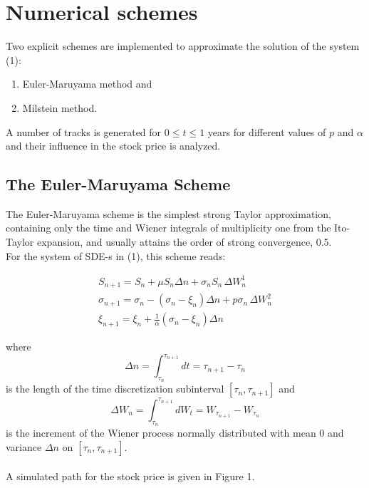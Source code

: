 \documentclass[11pt]{report}
\begin{document}

\section{Numerical schemes}

Two explicit schemes are implemented to approximate the solution of the system (1):
\begin{enumerate}
\item
Euler-Maruyama method and
\item Milstein method.
\end{enumerate}
A number of tracks is generated for $0\le t \le1$ years for different values of $p$ and $\alpha$ and their influence in the stock price is analyzed.

\subsection{The Euler-Maruyama Scheme}
The Euler-Maruyama scheme is the simplest strong Taylor approximation, containing only the time and Wiener integrals of multiplicity one from the Ito-Taylor expansion, and usually attains the order of strong convergence, 0.5.\\
For the system of SDE-s in (1), this scheme reads:

\begin{eqnarray}
\nonumber
S_{n+1} = S_n +\mu S_n \Delta n+ \sigma_n S_n \, \Delta W_n^1\\
\sigma_{n+1} = \sigma_n - (\sigma_n - \xi_n) \Delta n + p \sigma_n \, \Delta W_n^2 \\
\nonumber
\xi_{n+1} = \xi_n + \frac{1}{\alpha} (\sigma_n - \xi_n) \Delta n
\end{eqnarray}

where 
\begin{equation}
\Delta n = \int_{\tau_n}^{\tau_{n+1}} dt = \tau_{n+1} - \tau_n
\end{equation}
is the length of the time discretization subinterval $[\tau_n, \tau_{n+1}]$ and
\begin{equation}
\Delta W_n = \int_{\tau_n}^{\tau_{n+1}} dW_t = W_{\tau_{n+1}} - W_{\tau_n}
\end{equation}
is the increment of the Wiener process normally distributed with mean $0$ and variance $\Delta n$  on $[\tau_n, \tau_{n+1}]$.
\paragraph{}
A simulated path for the stock price is given in Figure 1. 
\clearpage
\end{document}
